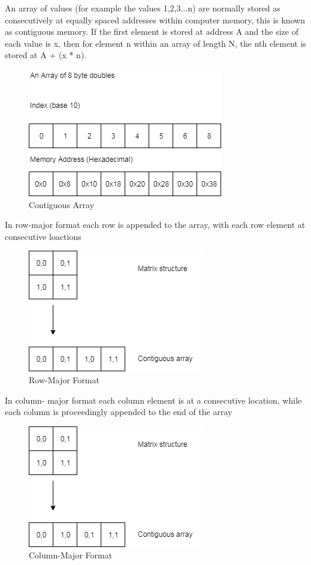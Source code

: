 \documentclass[a4paper]{amsart}
\begin{document}
An array of values (for example the values 1,2,3...n) are normally stored as consecutively at equally spaced addresses within computer memory, this is known as contiguous memory. If the first element is stored at address A and the size of each value is x, then for element n within an array of length N, the nth element is stored at A + (x * n).

\begin{figure}[h]
\centering
\includegraphics[scale=0.5]{ContiguousArray1.png}
\caption {Contiguous Array}
\label {fig:cont}
\end{figure}

In row-major format each row is appended to the array, with each row element at consecutive loactions

\begin{figure}[h]
\centering
\includegraphics[scale=0.5]{RowMajorFormat1.png}
\caption {Row-Major Format}
\label {fig:rowmajor}
\end{figure}


In column- major format each column element is at a consecutive location, while each column is proceedingly appended to the end of the array

\begin{figure}[h]
\centering
\includegraphics[scale=0.5]{ColumnMajorFormat1.png}
\caption {Column-Major Format}
\label {fig:colmajor}
\end{figure}
\end{document}
